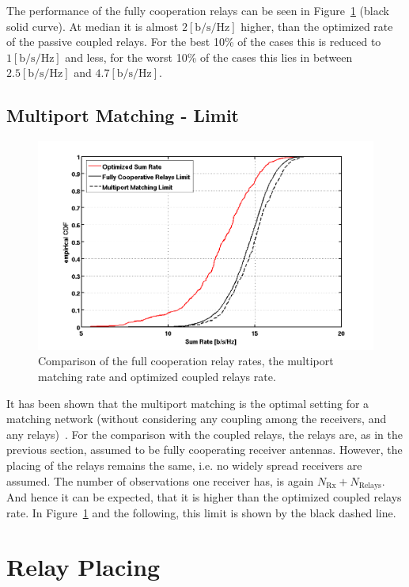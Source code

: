 The performance of the fully cooperation relays can be seen in Figure~\ref{fig:limcomparison} (black solid curve).
At median it is almost $2 \left[\text{b/s/Hz}\right]$ higher, than the optimized rate of the passive coupled relays.
For the best 10\% of the cases this is reduced to $1 \left[\text{b/s/Hz}\right]$ and less,
for the worst 10\% of the cases this lies in between  $2.5 \left[\text{b/s/Hz}\right]$ and $4.7 \left[\text{b/s/Hz}\right]$.


\subsection{Multiport Matching - Limit}
\label{sec:mp_limit}
\begin{figure}[h]
\centering
  \includegraphics[width=0.9\linewidth]{images/Limitcomparison.png}
\caption{Comparison of the full cooperation relay rates, the multiport matching rate and optimized coupled relays rate.}
\label{fig:limcomparison}
\end{figure}

It has been shown that the multiport matching is the optimal setting for a matching network (without considering any coupling among the receivers, and any relays)~\cite{Nossek}.
For the comparison with the coupled relays, the relays are, as in the previous section, assumed to be fully cooperating receiver antennas.
However, the placing of the relays remains the same, i.e. no widely spread receivers are assumed.
The number of observations one receiver has, is again $N_\text{Rx} + N_\text{Relays}$.
And hence it can be expected, that it is higher than the optimized coupled relays rate.
In Figure~\ref{fig:limcomparison} and the following, this limit is shown by the black dashed line.


\section{Relay Placing}
\label{sec:relay_placing}

